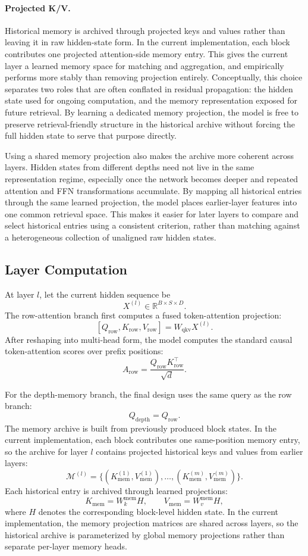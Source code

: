 \documentclass[11pt]{article}
\begin{document}
\paragraph{Projected K/V.}
Historical memory is archived through projected keys and values rather than leaving it in raw hidden-state form. In the current implementation, each block contributes one projected attention-side memory entry. This gives the current layer a learned memory space for matching and aggregation, and empirically performs more stably than removing projection entirely. Conceptually, this choice separates two roles that are often conflated in residual propagation: the hidden state used for ongoing computation, and the memory representation exposed for future retrieval. By learning a dedicated memory projection, the model is free to preserve retrieval-friendly structure in the historical archive without forcing the full hidden state to serve that purpose directly.

Using a shared memory projection also makes the archive more coherent across layers. Hidden states from different depths need not live in the same representation regime, especially once the network becomes deeper and repeated attention and FFN transformations accumulate. By mapping all historical entries through the same learned projection, the model places earlier-layer features into one common retrieval space. This makes it easier for later layers to compare and select historical entries using a consistent criterion, rather than matching against a heterogeneous collection of unaligned raw hidden states.

\subsection{Layer Computation}

At layer $l$, let the current hidden sequence be
\[
X^{(l)} \in \mathbb{R}^{B \times S \times D}.
\]
The row-attention branch first computes a fused token-attention projection:
\[
[Q_{\text{row}}, K_{\text{row}}, V_{\text{row}}] = W_{\text{qkv}} X^{(l)}.
\]
After reshaping into multi-head form, the model computes the standard causal token-attention scores over prefix positions:
\[
A_{\text{row}} = \frac{Q_{\text{row}} K_{\text{row}}^\top}{\sqrt{d}}.
\]

For the depth-memory branch, the final design uses the same query as the row branch:
\[
Q_{\text{depth}} = Q_{\text{row}}.
\]
The memory archive is built from previously produced block states. In the current implementation, each block contributes one same-position memory entry, so the archive for layer $l$ contains projected historical keys and values from earlier layers:
\[
\mathcal{M}^{(l)} = \{(K_{\text{mem}}^{(1)}, V_{\text{mem}}^{(1)}), \ldots, (K_{\text{mem}}^{(m)}, V_{\text{mem}}^{(m)})\}.
\]
Each historical entry is archived through learned projections:
\[
K_{\text{mem}} = W_k^{\text{mem}} H,\qquad V_{\text{mem}} = W_v^{\text{mem}} H,
\]
where $H$ denotes the corresponding block-level hidden state. In the current implementation, the memory projection matrices are shared across layers, so the historical archive is parameterized by global memory projections rather than separate per-layer memory heads.
\end{document}
